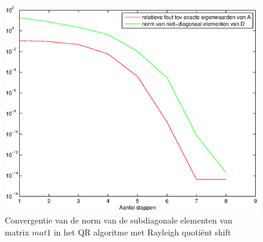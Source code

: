 \documentclass[a4paper]{article}
\begin{document}
\begin{figure}
\centerline{\includegraphics{pictures/opgave10.eps}}
\caption{Convergentie van de norm van de subdiagonale elementen van matrix $mat1$ in het QR algoritme met Rayleigh quoti\"{e}nt shift}
\label{fig:figure 3}
\end{figure}
\end{document}

